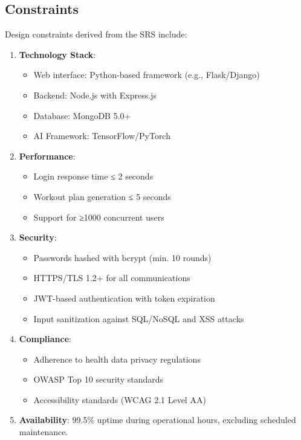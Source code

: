 \documentclass[a4paper,12pt]{report}
\begin{document}
\subsection{Constraints}
Design constraints derived from the SRS include:
\begin{enumerate}
    \item \textbf{Technology Stack}: 
    \begin{itemize}
        \item Web interface: Python-based framework (e.g., Flask/Django)
        \item Backend: Node.js with Express.js
        \item Database: MongoDB 5.0+
        \item AI Framework: TensorFlow/PyTorch
    \end{itemize}
    \item \textbf{Performance}: 
    \begin{itemize}
        \item Login response time ≤ 2 seconds
        \item Workout plan generation ≤ 5 seconds
        \item Support for ≥1000 concurrent users
    \end{itemize}
    \item \textbf{Security}: 
    \begin{itemize}
        \item Passwords hashed with bcrypt (min. 10 rounds)
        \item HTTPS/TLS 1.2+ for all communications
        \item JWT-based authentication with token expiration
        \item Input sanitization against SQL/NoSQL and XSS attacks
    \end{itemize}
    \item \textbf{Compliance}: 
    \begin{itemize}
        \item Adherence to health data privacy regulations
        \item OWASP Top 10 security standards
        \item Accessibility standards (WCAG 2.1 Level AA)
    \end{itemize}
    \item \textbf{Availability}: 99.5\% uptime during operational hours, excluding scheduled maintenance.
\end{enumerate}
\end{document}
